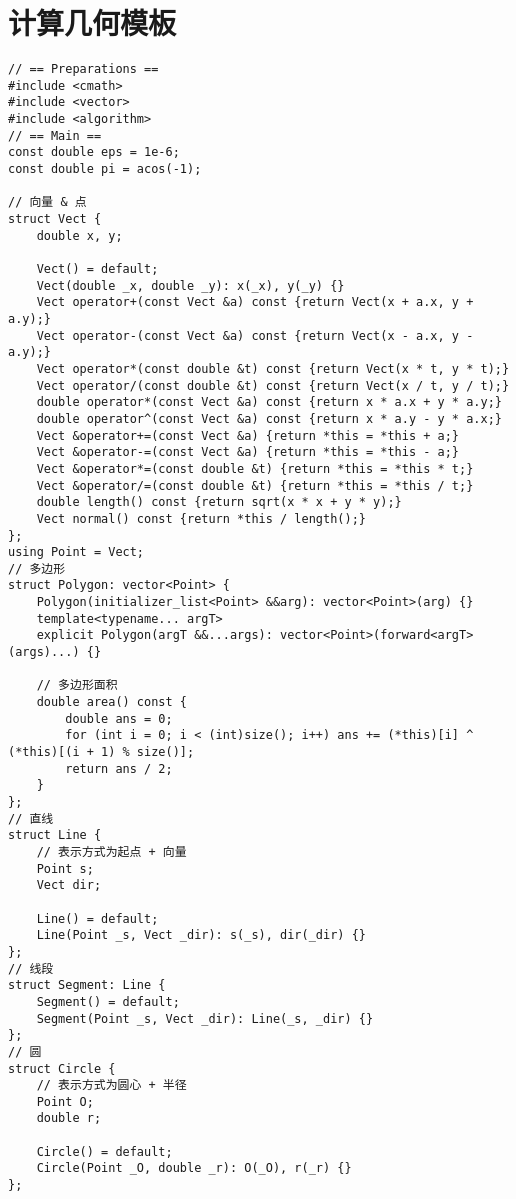 \section{计算几何模板}

\begin{verbatim}
// == Preparations ==
#include <cmath>
#include <vector>
#include <algorithm>
// == Main ==
const double eps = 1e-6;
const double pi = acos(-1);

// 向量 & 点
struct Vect {
    double x, y;

    Vect() = default;
    Vect(double _x, double _y): x(_x), y(_y) {}
    Vect operator+(const Vect &a) const {return Vect(x + a.x, y + a.y);}
    Vect operator-(const Vect &a) const {return Vect(x - a.x, y - a.y);}
    Vect operator*(const double &t) const {return Vect(x * t, y * t);}
    Vect operator/(const double &t) const {return Vect(x / t, y / t);}
    double operator*(const Vect &a) const {return x * a.x + y * a.y;}
    double operator^(const Vect &a) const {return x * a.y - y * a.x;}
    Vect &operator+=(const Vect &a) {return *this = *this + a;}
    Vect &operator-=(const Vect &a) {return *this = *this - a;}
    Vect &operator*=(const double &t) {return *this = *this * t;}
    Vect &operator/=(const double &t) {return *this = *this / t;}
    double length() const {return sqrt(x * x + y * y);}
    Vect normal() const {return *this / length();}
};
using Point = Vect;
// 多边形
struct Polygon: vector<Point> {
    Polygon(initializer_list<Point> &&arg): vector<Point>(arg) {}
    template<typename... argT>
    explicit Polygon(argT &&...args): vector<Point>(forward<argT>(args)...) {}

    // 多边形面积
    double area() const {
        double ans = 0;
        for (int i = 0; i < (int)size(); i++) ans += (*this)[i] ^ (*this)[(i + 1) % size()];
        return ans / 2;
    }
};
// 直线
struct Line {
    // 表示方式为起点 + 向量
    Point s;
    Vect dir;

    Line() = default;
    Line(Point _s, Vect _dir): s(_s), dir(_dir) {}
};
// 线段
struct Segment: Line {
    Segment() = default;
    Segment(Point _s, Vect _dir): Line(_s, _dir) {}
};
// 圆
struct Circle {
    // 表示方式为圆心 + 半径
    Point O;
    double r;

    Circle() = default;
    Circle(Point _O, double _r): O(_O), r(_r) {}
};


\end{verbatim}
